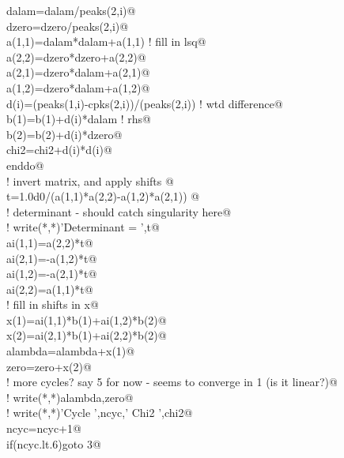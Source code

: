 \documentclass[10pt,a4paper,notitlepage]{article}
\begin{document}
\begin{flushleft}
\begin{list}{}{}
\mbox{}\verb@        dalam=dalam/peaks(2,i)@\\
\mbox{}\verb@        dzero=dzero/peaks(2,i)@\\
\mbox{}\verb@        a(1,1)=dalam*dalam+a(1,1)                          ! fill in lsq@\\
\mbox{}\verb@        a(2,2)=dzero*dzero+a(2,2)@\\
\mbox{}\verb@        a(2,1)=dzero*dalam+a(2,1)@\\
\mbox{}\verb@        a(1,2)=dzero*dalam+a(1,2)@\\
\mbox{}\verb@        d(i)=(peaks(1,i)-cpks(2,i))/(peaks(2,i))   ! wtd difference@\\
\mbox{}\verb@        b(1)=b(1)+d(i)*dalam                        ! rhs@\\
\mbox{}\verb@        b(2)=b(2)+d(i)*dzero@\\
\mbox{}\verb@        chi2=chi2+d(i)*d(i)@\\
\mbox{}\verb@      enddo@\\
\mbox{}\verb@! invert matrix, and apply shifts @\\
\mbox{}\verb@      t=1.0d0/(a(1,1)*a(2,2)-a(1,2)*a(2,1)) @\\
\mbox{}\verb@             ! determinant  - should catch singularity here@\\
\mbox{}\verb@!      write(*,*)'Determinant = ',t@\\
\mbox{}\verb@      ai(1,1)=a(2,2)*t@\\
\mbox{}\verb@      ai(2,1)=-a(1,2)*t@\\
\mbox{}\verb@      ai(1,2)=-a(2,1)*t@\\
\mbox{}\verb@      ai(2,2)=a(1,1)*t@\\
\mbox{}\verb@! fill in shifts in x@\\
\mbox{}\verb@      x(1)=ai(1,1)*b(1)+ai(1,2)*b(2)@\\
\mbox{}\verb@      x(2)=ai(2,1)*b(1)+ai(2,2)*b(2)@\\
\mbox{}\verb@      alambda=alambda+x(1)@\\
\mbox{}\verb@      zero=zero+x(2)@\\
\mbox{}\verb@! more cycles? say 5 for now - seems to converge in 1 (is it linear?)@\\
\mbox{}\verb@!      write(*,*)alambda,zero@\\
\mbox{}\verb@!      write(*,*)'Cycle ',ncyc,' Chi2 ',chi2@\\
\mbox{}\verb@      ncyc=ncyc+1@\\
\mbox{}\verb@      if(ncyc.lt.6)goto 3@\\

\end{list}
\end{flushleft}
\end{document}
